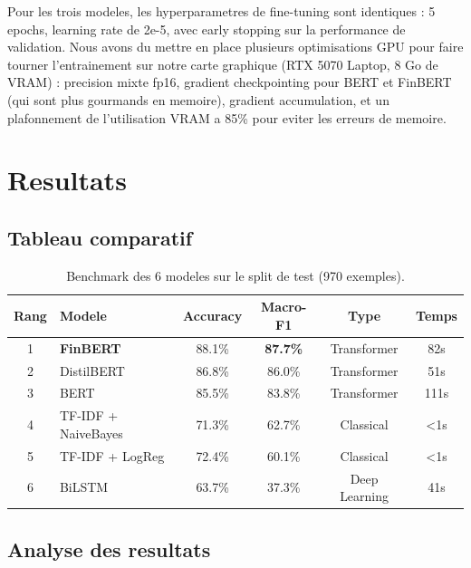 \documentclass[12pt, a4paper]{article}
\begin{document}
Pour les trois modeles, les hyperparametres de fine-tuning sont identiques : 5 epochs,
learning rate de 2e-5, avec early stopping sur la performance de validation. Nous
avons du mettre en place plusieurs optimisations GPU pour faire tourner l'entrainement
sur notre carte graphique (RTX 5070 Laptop, 8 Go de VRAM) : precision mixte fp16,
gradient checkpointing pour BERT et FinBERT (qui sont plus gourmands en memoire),
gradient accumulation, et un plafonnement de l'utilisation VRAM a 85\% pour eviter
les erreurs de memoire.

\section{Resultats}

\subsection{Tableau comparatif}

\begin{table}[h]
  \centering
  \begin{tabular}{clcccc}
    \toprule
    Rang & Modele & Accuracy & Macro-F1 & Type & Temps \\
    \midrule
    1 & \textbf{FinBERT}    & 88.1\% & \textbf{87.7\%} & Transformer   & 82s  \\
    2 & DistilBERT           & 86.8\% & 86.0\%           & Transformer   & 51s  \\
    3 & BERT                 & 85.5\% & 83.8\%           & Transformer   & 111s \\
    4 & TF-IDF + NaiveBayes  & 71.3\% & 62.7\%           & Classical     & <1s  \\
    5 & TF-IDF + LogReg      & 72.4\% & 60.1\%           & Classical     & <1s  \\
    6 & BiLSTM               & 63.7\% & 37.3\%           & Deep Learning & 41s  \\
    \bottomrule
  \end{tabular}
  \caption{Benchmark des 6 modeles sur le split de test (970 exemples).}
\end{table}

\subsection{Analyse des resultats}
\end{document}
